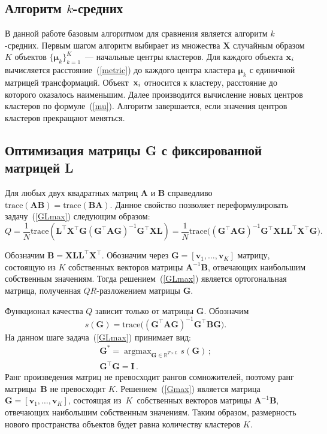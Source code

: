 \subsection{Алгоритм $k$-средних}
В данной работе базовым алгоритмом для сравнения является алгоритм $k$-средних.
Первым шагом алгоритм выбирает из множества $\mathbf{X}$ случайным образом $K$ объектов $\{\boldsymbol{\mu}_k\}_{k=1}^K$~--- начальные центры кластеров.
Для каждого объекта $\mathbf{x}_i$ вычисляется расстояние~(\ref{metric}) до каждого центра кластера $\boldsymbol{\mu}_k$ с единичной матрицей трансформаций.
Объект~$\mathbf{x}_i$ относится к кластеру, расстояние до которого оказалось наименьшим.
Далее производится вычисление новых центров кластеров по формуле~(\ref{mu}).
Алгоритм завершается, если значения центров кластеров прекращают меняться.

\subsection{Оптимизация матрицы G с фиксированной матрицей L}
Для любых двух квадратных матриц $\mathbf{A}$ и $\mathbf{B}$ справедливо $\text{trace}(\mathbf{AB}) = \text{trace}(\mathbf{BA})$.
Данное свойство позволяет переформулировать задачу~(\ref{GLmax}) следующим образом:
\[
Q = \frac 1N \text{trace} (\mathbf{L}^{\top} \mathbf{X}^{\top} \mathbf{G} (\mathbf{G}^{\top} \mathbf{A G})^{-1} \mathbf{G}^{\top} \mathbf{X L}) = \frac 1N \text{trace} \bigl((\mathbf{G}^{\top} \mathbf{A G})^{-1} \mathbf{G}^{\top} \mathbf{X L L}^{\top} \mathbf{X}^{\top} \mathbf{G}\bigr).
\]
\begin{theorem}
	Обозначим $\mathbf{B} = \mathbf{X L L}^{\top} \mathbf{X}^{\top}$.
	Обозначим через $\mathbf{G} = [\mathbf{v}_1, \ldots, \mathbf{v}_K]$ матрицу, состоящую из $K$ собственных векторов матрицы $\mathbf{A}^{-1}\mathbf{B}$, отвечающих наибольшим собственным значениям.
	Тогда решением~(\ref{GLmax}) является ортогональная матрица, полученная $QR$-раз\-ло\-же\-ни\-ем матрицы $\mathbf{G}$.
\end{theorem}

Функционал качества $Q$ зависит только от матрицы $\mathbf{G}$. Обозначим
\[
s(\mathbf{G}) = \text{trace} \bigl((\mathbf{G}^{\top} \mathbf{A G})^{-1} \mathbf{G}^{\top} \mathbf{B G}\bigr).
\]
На данном шаге задача~(\ref{GLmax}) принимает вид:
\begin{gather}
\label{Gmax}
\mathbf{G}^* = \mathop{\arg \max}_{\mathbf{G} \in \mathbb{R}^{T \times L}} s(\mathbf{G})\,; \\
\label{Gorth}
\mathbf{G}^{\top} \mathbf{G} = \mathbf{I}\,.
\end{gather}
Ранг произведения матриц не превосходит рангов сомножителей, поэтому ранг матрицы~$\mathbf{B}$ не превосходит $K$.
Решением~(\ref{Gmax}) является матрица $\mathbf{G} = [\mathbf{v}_1, \ldots, \mathbf{v}_K]$, состоящая
из~$K$~собственных векторов матрицы $\mathbf{A}^{-1}\mathbf{B}$, отвечающих наибольшим собственным значениям.
Таким образом, размерность нового пространства объектов будет равна количеству кластеров $K$.

